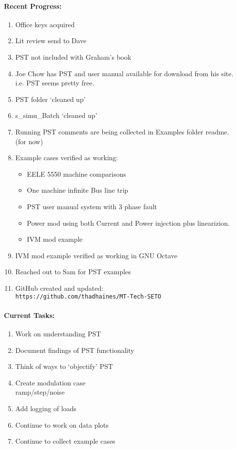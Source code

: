 \documentclass[12pt]{article}
\begin{document}
\begin{multicols}{2}
\raggedright

\paragraph{Recent Progress:}
	\begin{enumerate}
		\itemsep0em 
		\item Office keys acquired
		\item Lit review send to Dave
		\item PST not included with Graham's book 
		\item Joe Chow has PST and user manual available for download from his site.
		\\ i.e. PST seems pretty free.
		\item PST folder `cleaned up'
		\item s\_simu\_Batch `cleaned up'
		\item Running PST comments are being collected in Examples folder readme. \\ (for now)
		\item Example cases verified as working:
		\begin{itemize}
			\item EELE 5550 machine comparisons
			\item One machine infinite Bus line trip
			\item PST user manual system with 3 phase fault
			\item Power mod using both Current and Power injection plus linearizion.
			\item IVM mod example
		\end{itemize}
		\item IVM mod example verified as working in GNU Octave
		\item Reached out to Sam for PST examples
		\item GitHub created and updated:\\
	{\footnotesize	\verb|https://github.com/thadhaines/MT-Tech-SETO| }\\
	\end{enumerate}
	
\vfill\null
\columnbreak
	
\paragraph{Current Tasks:}
	\begin{enumerate}
		\itemsep0em 
		\item Work on understanding PST
		\item Document findings of PST functionality
		\item Think of ways to `objectify' PST
		\item Create modulation case \\ ramp/step/noise 
		\item Add logging of loads
		\item Continue to work on data plots 
		\item Continue to collect example cases
\end{enumerate}


\end{multicols}
\end{document}
